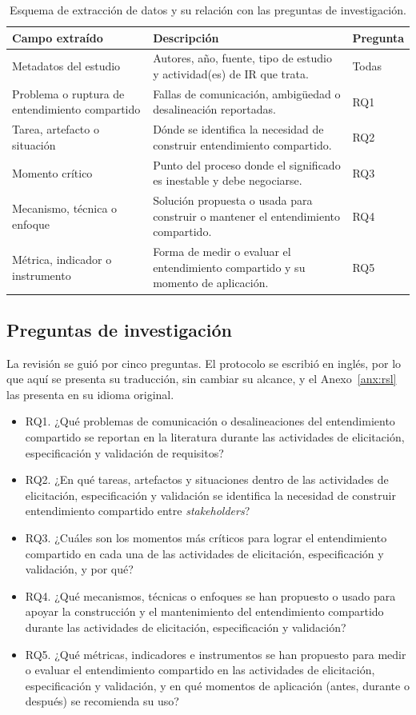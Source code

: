 \documentclass[12pt,letterpaper,oneside]{report}
\begin{document}
\begin{table}[H]
\caption{Esquema de extracción de datos y su relación con las preguntas de investigación.}
\label{tab:rsl_extraction}
\centering
\footnotesize
\renewcommand{\arraystretch}{1.15}
\begin{tabularx}{\textwidth}{@{}L{4.6cm}Y L{1.7cm}@{}}
\toprule
\textbf{Campo extraído} & \textbf{Descripción} & \textbf{Pregunta} \\
\midrule
Metadatos del estudio & Autores, año, fuente, tipo de estudio y actividad(es) de IR
que trata. & Todas \\
Problema o ruptura de entendimiento compartido & Fallas de comunicación, ambigüedad o
desalineación reportadas. & RQ1 \\
Tarea, artefacto o situación & Dónde se identifica la necesidad de construir
entendimiento compartido. & RQ2 \\
Momento crítico & Punto del proceso donde el significado es inestable y debe
negociarse. & RQ3 \\
Mecanismo, técnica o enfoque & Solución propuesta o usada para construir o mantener
el entendimiento compartido. & RQ4 \\
Métrica, indicador o instrumento & Forma de medir o evaluar el entendimiento compartido y su
momento de aplicación. & RQ5 \\
\bottomrule
\end{tabularx}
\end{table}

\subsection{Preguntas de investigación}
La revisión se guió por cinco preguntas. El protocolo se escribió en inglés,
por lo que aquí se presenta su traducción, sin cambiar su alcance, y el
Anexo~\ref{anx:rsl} las presenta en su idioma original.
\begin{itemize}
    \item RQ1. ¿Qué problemas de comunicación o desalineaciones del entendimiento compartido se reportan en la literatura durante las actividades de elicitación, especificación y validación de requisitos?
  \item RQ2. ¿En qué tareas, artefactos y situaciones dentro de las actividades de elicitación, especificación y validación se identifica la necesidad de construir entendimiento compartido entre \textit{stakeholders}?
  \item RQ3. ¿Cuáles son los momentos más críticos para lograr el entendimiento compartido en cada una de las actividades de elicitación, especificación y validación, y por qué?
  \item RQ4. ¿Qué mecanismos, técnicas o enfoques se han propuesto o usado para apoyar la construcción y el mantenimiento del entendimiento compartido durante las actividades de elicitación, especificación y validación?
  \item RQ5. ¿Qué métricas, indicadores e instrumentos se han propuesto para medir o evaluar el entendimiento compartido en las actividades de elicitación, especificación y validación, y en qué momentos de aplicación (antes, durante o después) se recomienda su uso?
\end{itemize}
\end{document}
